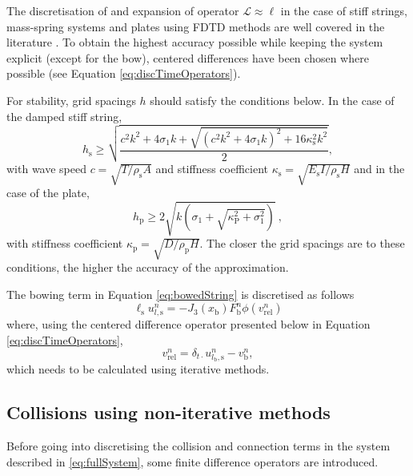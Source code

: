 \documentclass[dvipsnames, pdftex]{article}
\begin{document}
 
The discretisation of and expansion of operator $\mathcal{L}\approx \ell$ in the case of stiff strings, mass-spring systems and plates using FDTD methods are well covered in the literature \cite{bilbao2009numerical}. To obtain the highest accuracy possible while keeping the system explicit (except for the bow), centered differences have been chosen where possible (see Equation \eqref{eq:discTimeOperators}). 

For stability, grid spacings $h$ should satisfy the conditions below. In the case of the damped stiff string,
\begin{equation}
    h_\text{s} \geq \sqrt{\frac{c^2k^2+4\sigma_1k+\sqrt{(c^2k^2+4\sigma_1k)^2+16\kappa_\text{s}^2k^2}}{2}},
\end{equation}
with wave speed $c = \sqrt{T/\rho_\text{s}A}$ and stiffness coefficient $\kappa_\text{s} = \sqrt{E_\text{s}I/\rho_\text{s}H}$ and in the case of the plate,
\begin{equation}\label{eq:gridSpacingPlate}
    h_\text{p} \geq 2\sqrt{k\left(\sigma_1 + \sqrt{\kappa_\text{P}^2 + \sigma_1^2}\right)}\ ,
\end{equation}
with stiffness coefficient $\kappa_\text{p} = \sqrt{D/\rho_\text{p}H}$. The closer the grid spacings are to these conditions, the higher the accuracy of the approximation. 

The bowing term in Equation \eqref{eq:bowedString} is discretised as follows
\begin{equation}
    \ell_\text{s}u^n_{l,\text{s}} = -J_3(x_\text{b})F_\text{b}^n\phi(v_\text{rel}^n)
\end{equation}
where, using the centered difference operator presented below in Equation \eqref{eq:discTimeOperators},
\begin{equation}
    v_\text{rel}^n = \delta_{t\cdot}u_{l_\text{b},\text{s}}^n-v_\text{b}^n,
\end{equation}
which needs to be calculated using iterative methods.
\subsection{Collisions using non-iterative methods}
Before going into discretising the collision and connection terms in the system described in \eqref{eq:fullSystem}, some finite difference operators are introduced.
\end{document}

